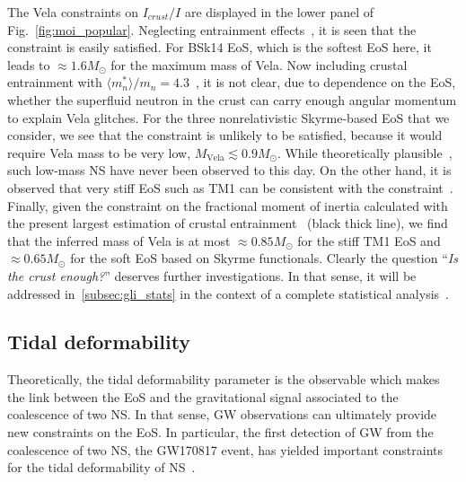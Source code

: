 The Vela constraints on $I_{crust}/I$ are displayed in the lower panel of 
Fig.~\ref{fig:moi_popular}. Neglecting entrainment effects~\cite{Link1999}, it
is seen that the constraint is easily satisfied. For BSk14 EoS, which is the
softest EoS here, it leads to $\approx 1.6M_\odot$ for the maximum mass of 
Vela. Now including crustal entrainment with $\langle m_n^*\rangle/m_n =
4.3$~\cite{Andersson2012}, it is not clear, due to dependence on the EoS, 
whether the superfluid neutron in the crust can carry enough angular momentum 
to explain Vela glitches. For the three nonrelativistic Skyrme-based EoS that 
we consider, we see that the constraint is unlikely to be satisfied, because it
would require Vela mass to be very low, $M_{\text{Vela}} \lesssim 0.9M_\odot$.
While theoretically plausible~\cite{Haensel2007}, such low-mass NS have never 
been observed to this day. On the other hand, it is observed that very stiff 
EoS such as TM1 can be consistent with the constraint~\cite{Piekarewicz2014}.
Finally, given the constraint on the fractional moment of inertia calculated 
with the present largest estimation of crustal entrainment~\cite{Delsate2016}
(black thick line), we find that the inferred mass of Vela is at most 
$\approx 0.85M_\odot$ for the stiff TM1 EoS and $\approx 0.65M_\odot$ for the 
soft EoS based on Skyrme functionals. Clearly the question 
``\textit{Is the crust enough?}'' deserves further investigations. In that 
sense, it will be addressed in~\ref{subsec:gli_stats} in the context of a 
complete statistical analysis~\cite{Carreau2019moi}.

\subsection{Tidal deformability}\label{subsec:tidal} %

Theoretically, the tidal deformability parameter is the 
observable which makes the link between the EoS and the gravitational signal
associated to the coalescence of two NS.
In that sense, GW observations can ultimately provide new constraints on the 
EoS. 
In particular, the first detection of GW from the coalescence of two NS, 
the GW170817 event, has yielded important constraints for the tidal 
deformability of NS~\cite{GW1}.

